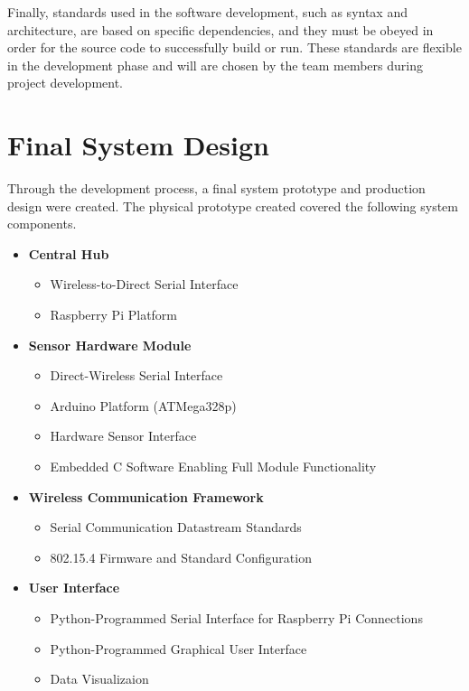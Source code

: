 \documentclass{report}
\begin{document}
Finally, standards used in the software development, such as syntax and architecture, are based on specific dependencies, and they must be obeyed in order for the source code to successfully build or run. These standards are flexible in the development phase and will are chosen by the team members during project development.

\newpage
\section{Final System Design}
Through the development process, a final system prototype and production design were created. The physical prototype created covered the following system components.
\begin{itemize}
    \item
          \textbf{Central Hub}
          \begin{itemize}
              \item
                    Wireless-to-Direct Serial Interface
              \item
                    Raspberry Pi Platform
          \end{itemize}
    \item
          \textbf{Sensor Hardware Module}
          \begin{itemize}
              \item
                    Direct-Wireless Serial Interface
              \item
                    Arduino Platform (ATMega328p)
              \item
                    Hardware Sensor Interface
              \item
                    Embedded C Software Enabling Full Module Functionality
          \end{itemize}
    \item
          \textbf{Wireless Communication Framework}
          \begin{itemize}
              \item
                    Serial Communication Datastream Standards
              \item
                    802.15.4 Firmware and Standard Configuration
          \end{itemize}
    \item
          \textbf{User Interface}
          \begin{itemize}
              \item
                    Python-Programmed Serial Interface for Raspberry Pi Connections
              \item
                    Python-Programmed Graphical User Interface
              \item
                    Data Visualizaion
          \end{itemize}
\end{itemize}
\end{document}
